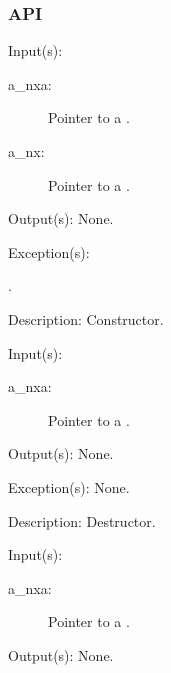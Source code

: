 \subsubsection{API}
\begin{capi}
\label{nxa_new}
	\begin{capilist}
	\item[Input(s): ]
		\begin{description}\item[]
		\item[a\_nxa: ]
			Pointer to a .
		\item[a\_nx: ]
			Pointer to a .
		\end{description}
	\item[Output(s): ] None.
	\item[Exception(s): ]
		\begin{description}\item[]
		\item[.]
		\end{description}
	\item[Description: ]
		Constructor.
	\end{capilist}
\label{nxa_delete}
	\begin{capilist}
	\item[Input(s): ]
		\begin{description}\item[]
		\item[a\_nxa: ]
			Pointer to a \classname{nxa}.
		\end{description}
	\item[Output(s): ] None.
	\item[Exception(s): ] None.
	\item[Description: ]
		Destructor.
	\end{capilist}
\label{nxa_collect}
	\begin{capilist}
	\item[Input(s): ]
		\begin{description}\item[]
		\item[a\_nxa: ]
			Pointer to a .
		\end{description}
	\item[Output(s): ] None.

\end{capilist}
\end{capi}
